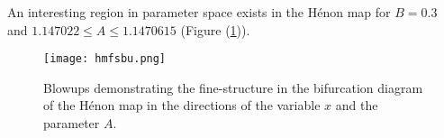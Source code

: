 An interesting region in parameter space exists in the H\'enon map for $B=0.3$ and $1.147022\leq A\leq1.1470615$ (Figure (\ref{fig:hmfsbu})).
\begin{figure}[h!]
	\centering
	\texttt{[image: hmfsbu.png]}
	\caption{Blowups demonstrating the fine-structure in the bifurcation diagram of the H\'enon map in the directions of the variable $x$ and the parameter $A$.}
	\label{fig:hmfsbu}
\end{figure}